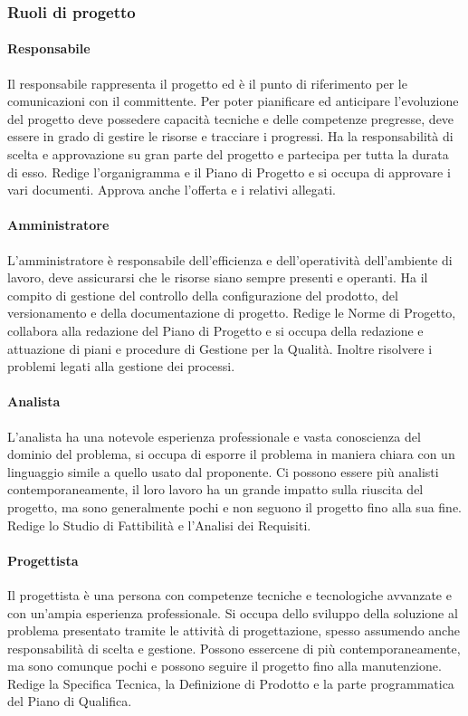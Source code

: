 \documentclass[../norme-di-progetto.tex]{subfiles}
\begin{document}
    \subsubsection{Ruoli di progetto}
        \paragraph{Responsabile}
        Il responsabile rappresenta il progetto ed è il punto di riferimento per le comunicazioni con il committente. Per poter pianificare ed anticipare l'evoluzione del progetto deve possedere capacità tecniche e delle competenze pregresse, deve essere in grado di gestire le risorse e tracciare i progressi. Ha la responsabilità di scelta e approvazione su gran parte del progetto e partecipa per tutta la durata di esso. Redige l'organigramma e il Piano di Progetto e si occupa di approvare i  vari documenti. Approva anche l'offerta e i relativi allegati.
        \paragraph{Amministratore}
        L'amministratore è responsabile dell'efficienza e dell'operatività dell'ambiente di lavoro, deve assicurarsi che le risorse siano sempre presenti e operanti. Ha il compito di gestione del controllo della configurazione del prodotto, del versionamento e della documentazione di progetto. Redige le Norme di Progetto, collabora alla redazione del Piano di Progetto e si occupa della redazione e attuazione di piani e procedure di Gestione per la Qualità. Inoltre risolvere i problemi legati alla gestione dei processi.
        \paragraph{Analista}
        L'analista ha una notevole esperienza professionale e vasta conoscienza del dominio del problema, si occupa di esporre il problema in maniera chiara con un linguaggio simile a quello usato dal proponente. Ci possono essere più analisti contemporaneamente, il loro lavoro ha un grande impatto sulla riuscita del progetto, ma sono generalmente pochi e non seguono il progetto fino alla sua fine. Redige lo Studio di Fattibilità e l'Analisi dei Requisiti.
        \paragraph{Progettista}
        Il progettista è una persona con competenze tecniche e tecnologiche avvanzate e con un'ampia esperienza professionale. Si occupa dello sviluppo della soluzione al problema presentato tramite le attività di progettazione, spesso assumendo anche responsabilità di scelta e gestione. Possono essercene di più contemporaneamente, ma sono comunque pochi e possono seguire il progetto fino alla manutenzione. Redige la Specifica Tecnica, la Definizione di Prodotto e la parte programmatica del Piano di Qualifica.
\end{document}
